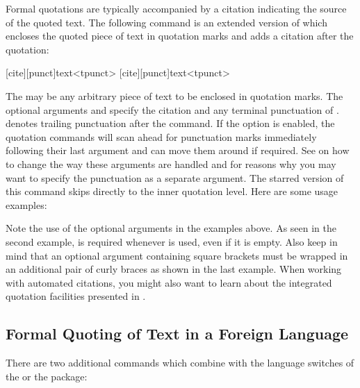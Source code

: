 \documentclass{ltxdockit}[2010/09/26]
\begin{document}
Formal quotations are typically accompanied by a citation indicating the source of the quoted text. The following command is an extended version of  which encloses the quoted piece of text in quotation marks and adds a citation after the quotation:

\begin{ltxsyntax}

[cite][punct]{text}<tpunct>
[cite][punct]{text}<tpunct>

The  may be any arbitrary piece of text to be enclosed in quotation marks. The optional arguments  and  specify the citation and any terminal punctuation of .  denotes trailing punctuation after the command. If the  option is enabled, the quotation commands will scan ahead for punctuation marks immediately following their last argument and can move them around if required. See  on how to change the way these arguments are handled and  for reasons why you may want to specify the punctuation as a separate argument. The starred version of this command skips directly to the inner quotation level. Here are some usage examples:

\begin{ltxcode}
\end{ltxcode}
%
Note the use of the optional arguments in the examples above. As seen in the second example,  is required whenever  is used, even if it is empty. Also keep in mind that an optional argument containing square brackets must be wrapped in an additional pair of curly braces as shown in the last example. When working with automated citations, you might also want to learn about the integrated quotation facilities presented in .

\end{ltxsyntax}

\subsection{Formal Quoting of Text in a Foreign Language}
\label{bas:txt:bbl}

There are two additional commands which combine  with the language switches of the  or the  package:
\end{document}
